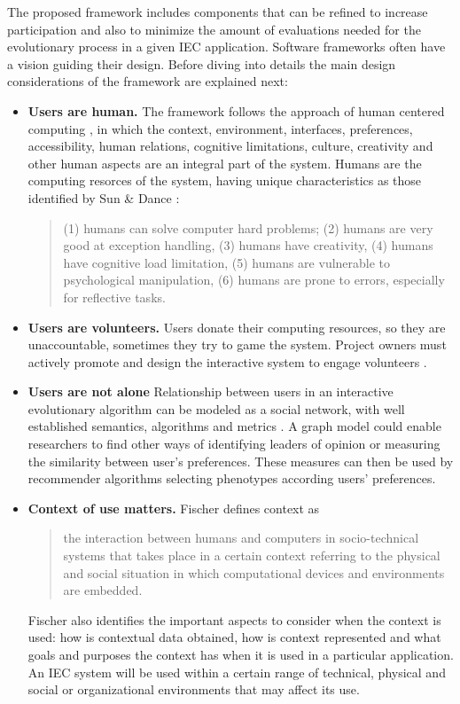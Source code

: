 The proposed framework includes components that can be refined to increase
participation and also to minimize the amount of evaluations needed for the evolutionary 
process in a given IEC application. Software frameworks often have 
a vision \cite{carneiro2010introducing} guiding their
design. Before diving into details the main design considerations of the
framework are explained next: 

\begin{itemize}
\item {\bf Users are human.} 
  The framework follows the approach of human centered computing \cite{sebe2010human},
  in which the context, environment, interfaces, preferences, accessibility, human relations,
  cognitive limitations, culture, creativity and other human aspects are an integral part 
  of the system. Humans are the computing resorces of the system, having unique characteristics
  as those identified by Sun \& Dance \cite{Sun2013}:
\begin{quote}
  (1) humans can solve computer hard problems; (2) humans are very good at exception handling,
  (3) humans have creativity, (4) humans have cognitive load limitation, (5) humans are
  vulnerable to psychological manipulation, (6) humans are prone to errors,
  especially for reflective tasks.
\end{quote}  


\item {\bf Users are volunteers.} Users donate their computing resources, so they are 
unaccountable, sometimes they try to game the system. Project owners must actively promote and
design the interactive system to engage volunteers \cite{oh2015clicking}. %
\item {\bf Users are not alone}
  Relationship between users in an interactive evolutionary algorithm can be modeled
  as a social network, with well established semantics, algorithms and metrics 
  \cite{ahuja1993network}.
  A graph model could enable researchers to find other ways of identifying leaders of 
  opinion or measuring the similarity between user's preferences. 
  These measures can then be used by recommender algorithms selecting 
  phenotypes according users' preferences. 

\item {\bf Context of use matters.}
  Fischer \cite{fischer2012context}
  defines context as
  \begin{quote}
  the interaction between humans and
  computers in socio-technical systems that takes place in a certain
  context referring to the physical and social situation in which
  computational devices and environments are embedded.
\end{quote}   
  Fischer also identifies the important aspects to consider when the context is used: how is
  contextual data obtained, how is context represented and what
  goals and purposes the context has when it is used in a particular
  application. An IEC system will  be used within a certain range 
  of technical, physical and social or
  organizational environments \cite{maguire2001context} that may affect its use.
 

\end{itemize}
